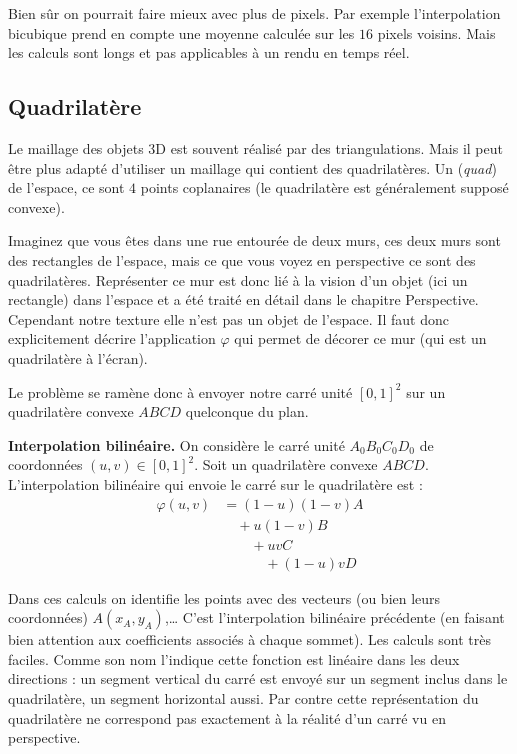 \documentclass[11pt,class=report,crop=false]{standalone}
\begin{document}
Bien sûr on pourrait faire mieux avec plus de pixels. Par exemple l'interpolation bicubique prend en compte une moyenne calculée sur les $16$ pixels voisins. Mais les calculs sont longs et pas applicables à un rendu en temps réel.


\subsection{Quadrilatère}

Le maillage des objets 3D est souvent réalisé par des triangulations. 
Mais il peut être plus adapté d'utiliser un maillage qui contient des quadrilatères.
Un  (\emph{quad}) de l'espace, ce sont $4$ points coplanaires (le quadrilatère est généralement supposé convexe).


Imaginez que vous êtes dans une rue entourée de deux murs, ces deux murs sont des rectangles de l'espace, mais ce que vous voyez en perspective ce sont des quadrilatères.
Représenter ce mur est donc lié à la vision d'un objet (ici un rectangle) dans l'espace et a été traité en détail dans le chapitre \og{}Perspective\fg{}. Cependant notre texture elle n'est pas un objet de l'espace. Il faut donc explicitement décrire l'application $\varphi$ qui permet de décorer ce mur (qui est un quadrilatère à l'écran).

Le problème se ramène donc à envoyer notre carré unité $[0,1]^2$ sur un quadrilatère convexe $ABCD$ quelconque du plan.


\medskip
\textbf{Interpolation bilinéaire.}
On considère le carré unité $A_0B_0C_0D_0$ de coordonnées $(u,v) \in [0,1]^2$.
Soit un quadrilatère convexe $ABCD$. L'interpolation bilinéaire qui envoie 
le carré sur le quadrilatère est :
\begin{align*}
\varphi(u,v)  
& = (1-u)(1-v) A  \\
& \quad +  u(1-v) B \\
& \quad\quad +   uv C \\
& \quad\quad\quad +  (1-u)v D
\end{align*}


Dans ces calculs on identifie les points avec des vecteurs (ou bien leurs coordonnées) $A(x_A,y_A)$,\ldots{}
C'est l'interpolation bilinéaire précédente (en faisant bien attention aux coefficients associés à chaque sommet). Les calculs sont très faciles. Comme son nom l'indique cette fonction est linéaire dans les deux directions : un segment vertical du carré est envoyé sur un segment inclus dans le quadrilatère, un segment horizontal aussi. Par contre cette représentation du quadrilatère ne correspond pas exactement à la réalité d'un carré vu en perspective.
\end{document}

